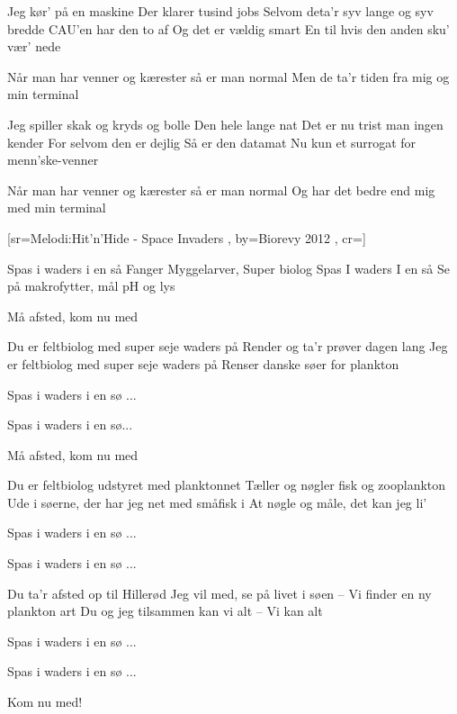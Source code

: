 \documentclass[pdftex,12pt]{article}
\begin{document}
\begin{songs}{}
\endverse
\beginverse
Jeg kør' på en maskine
Der klarer tusind jobs
Selvom deta'r syv lange og syv bredde
CAU'en har den to af
Og det er vældig smart
En til hvis den anden sku' vær' nede

\endverse
\beginverse
Når man har venner og kærester så er man normal
Men de ta'r tiden fra mig og min terminal

\endverse
\beginverse
Jeg spiller skak og kryds og bolle
Den hele lange nat
Det er nu trist man ingen kender
For selvom den er dejlig
Så er den datamat
Nu kun et surrogat for menn'ske-venner

\endverse
\beginverse
Når man har venner og kærester så er man normal
Og har det bedre end mig med min terminal

\endverse
\endsong



[sr={Melodi:Hit'n'Hide - Space Invaders}
,
by={Biorevy 2012}
,
cr={}]\hypertarget{Spas i Waders}{}
\label{song39}

\beginverse
Spas i waders i en så
Fanger Myggelarver, Super biolog
Spas I waders I en så
Se på makrofytter, mål pH og lys

\endverse
\beginverse
Må afsted, kom nu med

\endverse
\beginverse
Du er feltbiolog med super seje waders på
Render og ta'r prøver dagen lang
Jeg er feltbiolog med super seje waders på
Renser danske søer for plankton

\endverse
\beginverse
Spas i waders i en sø ...

\endverse
\beginverse
Spas i waders i en sø...

\endverse
\beginverse
Må afsted, kom nu med

\endverse
\beginverse
Du er feltbiolog udstyret med planktonnet
Tæller og nøgler fisk og zooplankton
Ude i søerne, der har jeg net med småfisk i
At nøgle og måle, det kan jeg li'

\endverse
\beginverse
Spas i waders i en sø ...

\endverse
\beginverse
Spas i waders i en sø ...

\endverse
\beginverse
Du ta'r afsted op til Hillerød
Jeg vil med, se på livet i søen
 -- Vi finder en ny plankton art
Du og jeg tilsammen kan vi alt
 -- Vi kan alt

\endverse
\beginverse
Spas i waders i en sø ...

\endverse
\beginverse
Spas i waders i en sø ...

\endverse
\beginverse
Kom nu med!


\end{songs}
\end{document}

